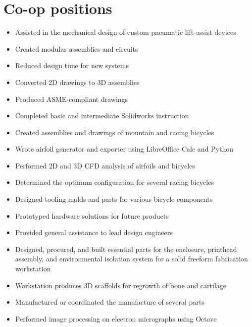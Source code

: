\documentclass[10pt]{moderncv}
\begin{document}
\section{Co-op positions}
%
    {
        \begin{itemize}
          \item Assisted in the mechanical design of custom pneumatic lift-assist devices
          \item Created modular assemblies and circuits
          \item Reduced design time for new systems
          \item Converted 2D drawings to 3D assemblies
          \item Produced ASME-compliant drawings
        \end{itemize}
    }
%
    {
        \begin{itemize}
          \item Completed basic and intermediate Solidworks instruction
          \item Created assemblies and drawings of mountain and racing bicycles
          \item Wrote airfoil generator and exporter using LibreOffice Calc and Python
          \item Performed 2D and 3D CFD analysis of airfoils and bicycles
          \item Determined the optimum configuration for several racing bicycles
          \item Designed tooling molds and parts for various bicycle components
        \end{itemize}
    }
%
    {
        \begin{itemize}
          \item Prototyped hardware solutions for future products
          \item Provided general assistance to lead design engineers
        \end{itemize}
    }
%
    {
        \begin{itemize}
          \item Designed, procured, and built essential parts for the enclosure, printhead assembly, and environmental isolation system for a solid freeform fabrication workstation
          \item Workstation produces 3D scaffolds for regrowth of bone and cartilage
          \item Manufactured or coordinated the manufacture of several parts
          \item Performed image processing on electron micrographs using Octave
        \end{itemize}
    }
\end{document}
